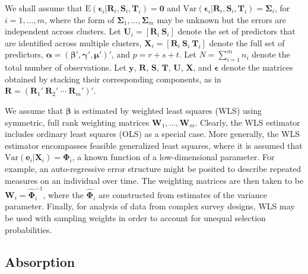 \documentclass[12pt]{article}
\begin{document}
We shall assume that
\(\text{E}\left(\boldsymbol\epsilon_i\left|\mathbf{R}_i,\mathbf{S}_i, \mathbf{T}_i\right.\right) = \mathbf{0}\)
and
\(\text{Var}\left(\boldsymbol\epsilon_i\left|\mathbf{R}_i,\mathbf{S}_i,\mathbf{T}_i\right.\right) = \boldsymbol\Sigma_i\),
for \(i = 1,...,m\), where the form of
\(\boldsymbol\Sigma_1,...,\boldsymbol\Sigma_m\) may be unknown but the
errors are independent across clusters. Let
\(\mathbf{U}_i = \left[\mathbf{R}_i \ \mathbf{S}_i \right]\) denote the
set of predictors that are identified across multiple clusters,
\(\mathbf{X}_i = \left[\mathbf{R}_i \ \mathbf{S}_i \ \mathbf{T}_i \right]\)
denote the full set of predictors,
\(\boldsymbol\alpha = \left(\boldsymbol\beta', \boldsymbol\gamma', \boldsymbol\mu' \right)'\),
and \(p = r + s + t\). Let \(N = \sum_{i=1}^m n_i\) denote the total
number of observations. Let \(\mathbf{y}\), \(\mathbf{R}\),
\(\mathbf{S}\), \(\mathbf{T}\), \(\mathbf{U}\), \(\mathbf{X}\), and
\(\boldsymbol\epsilon\) denote the matrices obtained by stacking their
corresponding components, as in
\(\mathbf{R} = \left(\mathbf{R}_1' \ \mathbf{R}_2' \ \cdots \ \mathbf{R}_m'\right)'\).

We assume that \(\boldsymbol\beta\) is estimated by weighted least
squares (WLS) using symmetric, full rank weighting matrices
\(\mathbf{W}_1,...,\mathbf{W}_m\). Clearly, the WLS estimator includes
ordinary least squares (OLS) as a special case. More generally, the WLS
estimator encompasses feasible generalized least squares, where it is
assumed that
\(\text{Var}\left(\mathbf{e}_i\left|\mathbf{X}_i\right.\right) = \boldsymbol\Phi_i\),
a known function of a low-dimensional parameter. For example, an
auto-regressive error structure might be posited to describe repeated
measures on an individual over time. The weighting matrices are then
taken to be \(\mathbf{W}_i = \hat{\boldsymbol\Phi}_i^{-1}\), where the
\(\hat{\boldsymbol\Phi}_i\) are constructed from estimates of the
variance parameter. Finally, for analysis of data from complex survey
designs, WLS may be used with sampling weights in order to account for
unequal selection probabilities.

\hypertarget{absorption}{%
\subsection{Absorption}\label{absorption}}
\end{document}
